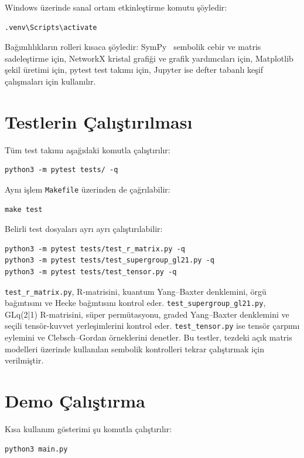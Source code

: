 \documentclass[12pt,a4paper]{report}
\numberwithin{equation}{chapter}
\theoremstyle{plain}
\theoremstyle{definition}
\begin{document}
Windows üzerinde sanal ortam etkinleştirme komutu şöyledir:
\begin{lstlisting}[style=bashblock]
.venv\Scripts\activate
\end{lstlisting}

Bağımlılıkların rolleri kısaca şöyledir: SymPy~\cite{SymPy} sembolik cebir ve matris
sadeleştirme için, NetworkX kristal grafiği ve grafik yardımcıları için,
Matplotlib şekil üretimi için, pytest test takımı için, Jupyter ise defter
tabanlı keşif çalışmaları için kullanılır.

\section{Testlerin Çalıştırılması}

Tüm test takımı aşağıdaki komutla çalıştırılır:
\begin{lstlisting}[style=bashblock]
python3 -m pytest tests/ -q
\end{lstlisting}

Aynı işlem \texttt{Makefile} üzerinden de çağrılabilir:
\begin{lstlisting}[style=bashblock]
make test
\end{lstlisting}

Belirli test dosyaları ayrı ayrı çalıştırılabilir:
\begin{lstlisting}[style=bashblock]
python3 -m pytest tests/test_r_matrix.py -q
python3 -m pytest tests/test_supergroup_gl21.py -q
python3 -m pytest tests/test_tensor.py -q
\end{lstlisting}

\texttt{test\_r\_matrix.py}, R-matrisini, kuantum Yang--Baxter denklemini,
örgü bağıntısını ve Hecke bağıntısını kontrol eder.
\texttt{test\_supergroup\_gl21.py}, GLq(2|1) R-matrisini, süper
permütasyonu, graded Yang--Baxter denklemini ve seçili tensör-kuvvet
yerleşimlerini kontrol eder. \texttt{test\_tensor.py} ise tensör çarpımı
eylemini ve Clebsch--Gordan örneklerini denetler. Bu testler, tezdeki açık
matris modelleri üzerinde kullanılan sembolik kontrolleri tekrar çalıştırmak
için verilmiştir.

\section{Demo Çalıştırma}

Kısa kullanım gösterimi şu komutla çalıştırılır:
\begin{lstlisting}[style=bashblock]
python3 main.py
\end{lstlisting}
\end{document}
